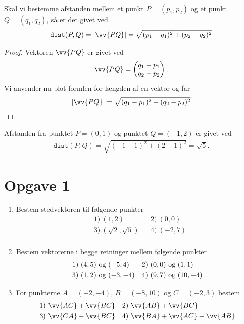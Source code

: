 \begin{setn}
Skal vi bestemme afstanden mellem et punkt $P = (p_1,p_2)$ og et punkt $Q = (q_1,q_2)$, så er det givet ved
\begin{align*}
\texttt{dist}(P,Q) = |\vv{PQ}| = \sqrt{(p_1-q_1)^2+(p_2-q_2)^2}
\end{align*}
\end{setn}
\begin{proof}
Vektoren $\vv{PQ}$ er givet ved
\begin{align*}
\vv{PQ}=\begin{pmatrix}
q_1-p_1\\q_2-p_2
\end{pmatrix}.
\end{align*}
Vi anvender nu blot formlen for længden af en vektor og får
\begin{align*}
|\vv{PQ}| = \sqrt{(q_1-p_1)^2+(q_2-p_2)^2}
\end{align*}
\end{proof}
\begin{exa}
Afstanden fra punktet $P = (0,1)$ og punktet $Q=(-1,2)$ er givet ved
\begin{align*}
\texttt{dist}(P,Q) = \sqrt{(-1-1)^2+(2-1)^2} = \sqrt{5}.
\end{align*}
\end{exa}
\section{Opgave 1}
\begin{enumerate}[label=\roman*)]
\item Bestem stedvektoren til følgende punkter 
\begin{align*}
&1) \ (1,2)   &&2) \  (0,0)  \\
&3) \  (\sqrt{2},\sqrt{5})  &&4) \ (-2,7)    \\
\end{align*}
\item Bestem vektorerne i begge retninger mellem følgende punkter
\begin{align*}
&1) \ (4,5) \textnormal{ og } (-5,4) &&2) \ (0,0) \textnormal{ og } (1,1)  \\
&3) \  (1,2)\textnormal{ og }(-3,-4)   &&4) \ (9,7)\textnormal{ og }(10,-4)   \\
\end{align*}
\item For punkterne $A = (-2,-4)$, $B = (-8,10)$ og $C = (-2,3)$ bestem
\begin{align*}
&1) \ \vv{AC} + \vv{BC}  &&2) \ \vv{AB} + \vv{BC}   \\
&3) \ \vv{CA} - \vv{BC}  &&4) \ \vv{BA} + \vv{AC} + \vv{AB}   \\
\end{align*}
\end{enumerate}
